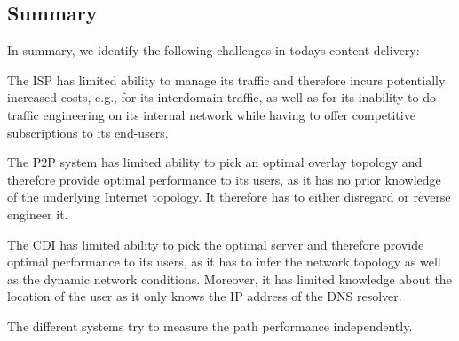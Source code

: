 \subsection{Summary}

In summary, we identify the following challenges in todays content delivery:

\begin{itemize*}

\item The ISP has limited ability to manage its traffic and therefore incurs
  potentially increased costs, e.g., for its interdomain traffic, as well as
  for its inability to do traffic engineering on its internal network while
  having to offer competitive subscriptions to its end-users.

\item The P2P system has limited ability to pick an optimal overlay topology
  and therefore provide optimal performance to its users, as it has no prior
  knowledge of the underlying Internet topology. It therefore has to either
  disregard or reverse engineer it.

\item The CDI has limited ability to pick the optimal server and therefore
  provide optimal performance to its users, as it has to infer the network
  topology as well as the dynamic network conditions. Moreover, it has limited
  knowledge about the location of the user as it only knows the IP address of
  the DNS resolver.

\item The different systems try to measure the path performance independently.

\end{itemize*}
